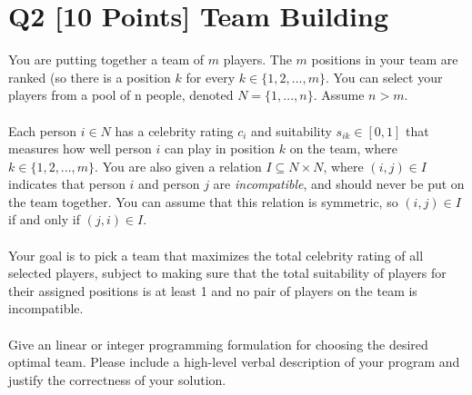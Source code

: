 \documentclass[10pt]{article}
\begin{document}
\section*{Q2 [10 Points] Team Building}
You are putting together a team of $m$ players. The $m$ positions in your team are ranked (so there is a position $k$ for every $k \in \{1, 2, ..., m\}$. You can select your players from a pool of n people, denoted $N = \{1, ..., n\}$. Assume $n > m$.\\
\\
Each person $i \in N$ has a celebrity rating $c_i$ and suitability $s_{ik} \in [0, 1]$ that measures how well person $i$ can play in position $k$ on the team, where $k \in \{1, 2, ... , m\}$. You are also given a relation
$I \subseteq N \times N$, where $(i, j) \in I$ indicates that person $i$ and person $j$ are \textit{incompatible}, and should never be put on the team together. You can assume that this relation is symmetric, so $(i, j) \in I$ if and only if $(j, i) \in I$.\\
\\
Your goal is to pick a team that maximizes the total celebrity rating of all selected players, subject to making sure that the total suitability of players for their assigned positions is at least 1 and no pair of players on the team is incompatible.\\
\\
Give an linear or integer programming formulation for choosing the desired optimal team. Please include a high-level verbal description of your program and justify the correctness of your solution.
\end{document}
